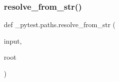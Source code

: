 \subsubsection{\texorpdfstring{resolve\+\_\+from\+\_\+str()}{resolve\_from\_str()}}
{\footnotesize\ttfamily def \+\_\+pytest.\+paths.\+resolve\+\_\+from\+\_\+str (\begin{DoxyParamCaption}\item[{}]{input,  }\item[{}]{root }\end{DoxyParamCaption})}

